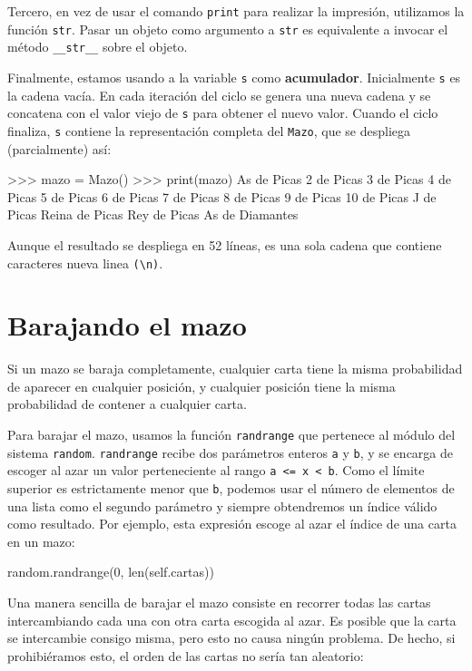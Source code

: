 Tercero, en vez de usar el comando \texttt{print} para realizar la
impresión, utilizamos la función \texttt{str}. Pasar un objeto como
argumento a \texttt{str} es equivalente a invocar el método \texttt{\_\_str\_\_}
sobre el objeto.


Finalmente, estamos usando a la variable \texttt{s} como \textbf{acumulador}.
Inicialmente \texttt{s} es la cadena vacía. En cada iteración del
ciclo se genera una nueva cadena y se concatena con el valor viejo
de \texttt{s} para obtener el nuevo valor. Cuando el ciclo finaliza,
\texttt{s} contiene la representación completa del \texttt{Mazo},
que se despliega (parcialmente) así:

\begin{pythoncode}
>>> mazo = Mazo()
>>> print(mazo)
As de Picas
 2 de Picas
  3 de Picas
   4 de Picas
    5 de Picas
     6 de Picas
      7 de Picas
       8 de Picas
        9 de Picas
         10 de Picas
          J de Picas
           Reina de Picas
            Rey de Picas
             As de Diamantes
\end{pythoncode}
 Aunque el resultado se despliega en 52 líneas, es una sola cadena
que contiene caracteres nueva linea \verb+(\n)+.

\section{Barajando el mazo}


Si un mazo se baraja completamente, cualquier carta tiene la misma
probabilidad de aparecer en cualquier posición, y cualquier posición
tiene la misma probabilidad de contener a cualquier carta.

 

Para barajar el mazo, usamos la función \texttt{randrange} que pertenece
al módulo del sistema \texttt{random}. \texttt{randrange} recibe dos
parámetros enteros \texttt{a} y \texttt{b}, y se encarga de escoger
al azar un valor perteneciente al rango \texttt{a <= x < b}. Como
el límite superior es estrictamente menor que \texttt{b}, podemos
usar el número de elementos de una lista como el segundo parámetro
y siempre obtendremos un índice válido como resultado. Por ejemplo,
esta expresión escoge al azar el índice de una carta en un mazo:

\begin{pythoncode}
random.randrange(0, len(self.cartas))
\end{pythoncode}
 Una manera sencilla de barajar el mazo consiste en recorrer todas
las cartas intercambiando cada una con otra carta escogida al azar.
Es posible que la carta se intercambie consigo misma, pero esto no
causa ningún problema. De hecho, si prohibiéramos esto, el orden de
las cartas no sería tan aleatorio:

